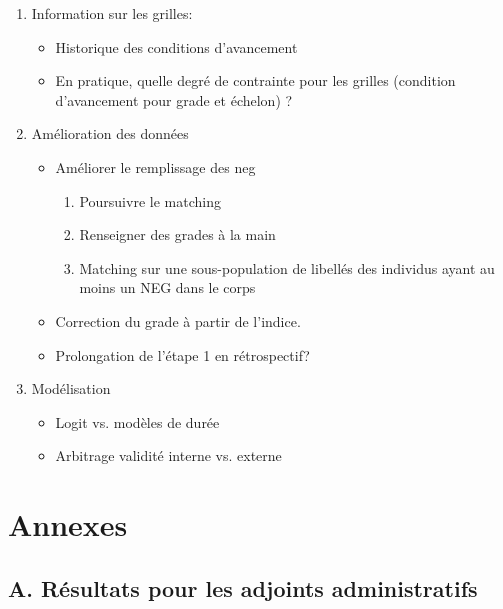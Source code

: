 \documentclass[11pt,a4paper]{article}
\begin{document}
\begin{enumerate}

\item Information sur les grilles: 
\begin{itemize}[leftmargin=1cm ,parsep=0cm,itemsep=0cm,topsep=0cm] 
\item Historique des conditions d'avancement
\item En pratique, quelle degré de contrainte pour les grilles (condition d'avancement pour grade et échelon) ? 
\end{itemize}

\item Amélioration des données 
\begin{itemize}[leftmargin=1cm ,parsep=0cm,itemsep=0cm,topsep=0cm] 
\item Améliorer le remplissage des neg 
	\begin{enumerate}[leftmargin=1cm ,parsep=0cm,itemsep=0cm,topsep=0cm] 
	\item Poursuivre le matching
	\item Renseigner des grades à la main 
	\item Matching sur une sous-population de libellés des individus ayant au moins un NEG dans le corps
	\end{enumerate}
\item Correction du grade à partir de l'indice. 
\item Prolongation de l'étape 1 en rétrospectif?
\end{itemize}

\item Modélisation
\begin{itemize}
\item Logit vs. modèles de durée
\item Arbitrage validité interne vs. externe
\end{itemize}



\end{enumerate}




\clearpage
\section*{Annexes}

\subsection*{A. Résultats pour les adjoints administratifs}
\setcounter{table}{0}
\setcounter{figure}{0}
\renewcommand{\thefigure}{A.\arabic{figure}}
\renewcommand{\thetable}{A.\arabic{table}}
\end{document}
